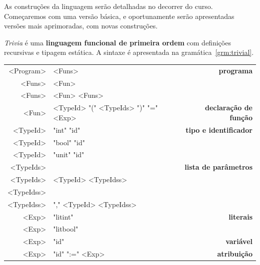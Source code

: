 \documentclass[a4paper,11pt,brazil]{article}
\newcommand{\lang}{\textsl{Trivia}}
\begin{document}
As construções da linguagem serão detalhadas no decorrer do
curso. Começaremos com uma versão básica, e oportunamente serão
apresentadas versões mais aprimoradas, com novas construções.

\lang{} é uma \textbf{linguagem funcional de primeira ordem} com
definições recursivas e tipagem estática. A sintaxe é apresentada na
gramática~\ref{grm:trivial}.

\begin{gramatica}
  \begin{synshorts}
    \begin{mdframed}
    \begin{tabular}{r@{$\;\rightarrow\;$}l>{\bfseries}r}
      <Program>  & <Funs>                               & programa                \\[.9em]
      <Funs>     & <Fun>                                &                         \\
      <Funs>     & <Fun> <Funs>                         &                         \\[.9em]
      <Fun>      & <TypeId> "(" <TypeIds> ")" "=" <Exp> & declaração de função    \\[.9em]
      <TypeId>   & "int" "id"                           & tipo e identificador    \\
      <TypeId>   & "bool" "id"                          &                         \\
      <TypeId>   & "unit" "id"                          &                         \\[.9em]
      <TypeIds>  &                                      & lista de parâmetros     \\
      <TypeIds>  & <TypeId> <TypeIdss>                  &                         \\[.9em]
      <TypeIdss> &                                      &                         \\
      <TypeIdss> & "," <TypeId> <TypeIdss>              &                         \\[.9em]
      <Exp>      & "litint"                             & literais                \\
      <Exp>      & "litbool"                            &                         \\
      <Exp>      & "id"                                 & variável                \\
      <Exp>      & "id" ":=" <Exp>                      & atribuição              \\

\end{tabular}
\end{mdframed}
\end{synshorts}
\end{gramatica}
\end{document}

